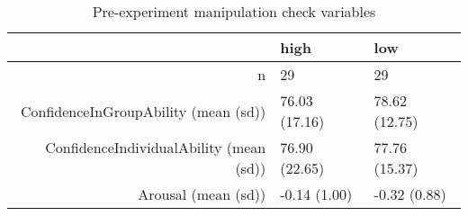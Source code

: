 \begin{table}[ht]
\centering
\begin{tabular}{rll}
  \hline
 & high & low \\ 
  \hline
n &    29 &    29 \\ 
  ConfidenceInGroupAbility (mean (sd)) & 76.03 (17.16) & 78.62 (12.75) \\ 
  ConfidenceIndividualAbility (mean (sd)) & 76.90 (22.65) & 77.76 (15.37) \\ 
  Arousal (mean (sd)) & -0.14 (1.00) & -0.32 (0.88) \\ 
   \hline
\end{tabular}
\caption{Pre-experiment manipulation check variables} 
\label{tab:manipulationCheckTable}
\end{table}
